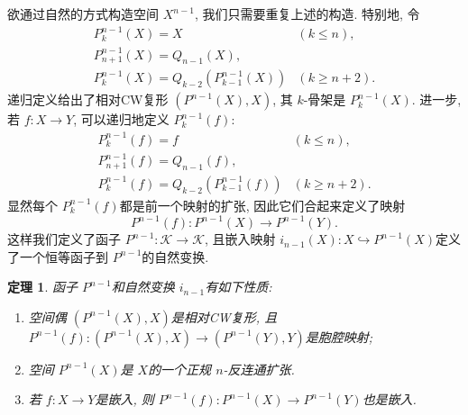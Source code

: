\documentclass{ctexart}
\theoremstyle{plain}
\newtheorem{theorem}{定理}[section]
\theoremstyle{definition}
\begin{document}
        欲通过自然的方式构造空间 $X^{n-1}$, 我们只需要重复上述的构造. 特别地, 令
        \begin{equation*}
            \begin{array}{ll}
                P_k^{n-1}(X)=X & (k \leq n), \\
                P_{n+1}^{n-1}(X)=Q_{n-1}(X), & \\
                P_k^{n-1}(X)=Q_{k-2}\left(P_{k-1}^{n-1}(X)\right) & (k \geq n+2).
            \end{array}
        \end{equation*}
        递归定义给出了相对CW复形 $(P^{n-1}(X),X)$, 其 $k$-骨架是 $P^{n-1}_{k}(X)$. 进一步, 若 $f:X\to Y$, 可以递归地定义 $P_{k}^{n-1}(f)$:
        \begin{equation*}
            \begin{array}{ll}
                P_k^{n-1}(f)=f & (k \leq n), \\
                P_{n+1}^{n-1}(f)=Q_{n-1}(f), & \\
                P_k^{n-1}(f)=Q_{k-2}\left(P_{k-1}^{n-1}(f)\right) & (k \geq n+2).
            \end{array}
        \end{equation*}
        显然每个 $P_{k}^{n-1}(f)$都是前一个映射的扩张, 因此它们合起来定义了映射 
        \begin{equation*}
          P^{n-1}(f):P^{n-1}(X)\to P^{n-1}(Y).
        \end{equation*}
        这样我们定义了函子 $P^{n-1}:\mathcal{K}\to \mathcal{K}$, 且嵌入映射 $i_{n-1}(X):X\hookrightarrow P^{n-1}(X)$定义了一个恒等函子到 $P^{n-1}$的自然变换.

        \begin{theorem}
            函子 $P^{n-1}$和自然变换 $i_{n-1}$有如下性质:
            \begin{enumerate}
                \item 空间偶 $(P^{n-1}(X),X)$是相对CW复形, 且 $P^{n-1}(f):(P^{n-1}(X),X)\to (P^{n-1}(Y),Y)$是胞腔映射;
                \item 空间 $P^{n-1}(X)$是 $X$的一个正规 $n$-反连通扩张.
                \item 若 $f:X\to Y$是嵌入, 则 $P^{n-1}(f):P^{n-1}(X)\to P^{n-1}(Y)$也是嵌入.
            \end{enumerate}
        \end{theorem}
\end{document}
